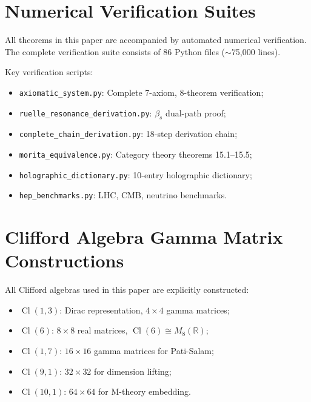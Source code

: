 \documentclass[12pt,a4paper]{article}
\newcommand{\R}{\mathbb{R}}
\newcommand{\Cl}{\operatorname{Cl}}
\begin{document}
\appendix
\section{Numerical Verification Suites}

All theorems in this paper are accompanied by automated numerical verification. 
The complete verification suite consists of 86 Python files ($\sim$75,000 lines).

Key verification scripts:
\begin{itemize}
  \item \texttt{axiomatic\_system.py}: Complete 7-axiom, 8-theorem verification;
  \item \texttt{ruelle\_resonance\_derivation.py}: $\beta_s$ dual-path proof;
  \item \texttt{complete\_chain\_derivation.py}: 18-step derivation chain;
  \item \texttt{morita\_equivalence.py}: Category theory theorems 15.1--15.5;
  \item \texttt{holographic\_dictionary.py}: 10-entry holographic dictionary;
  \item \texttt{hep\_benchmarks.py}: LHC, CMB, neutrino benchmarks.
\end{itemize}

\section{Clifford Algebra Gamma Matrix Constructions}

All Clifford algebras used in this paper are explicitly constructed:
\begin{itemize}
  \item $\Cl(1,3)$: Dirac representation, $4\times4$ gamma matrices;
  \item $\Cl(6)$: $8\times8$ real matrices, $\Cl(6) \cong M_8(\R)$;
  \item $\Cl(1,7)$: $16\times16$ gamma matrices for Pati-Salam;
  \item $\Cl(9,1)$: $32\times32$ for dimension lifting;
  \item $\Cl(10,1)$: $64\times64$ for M-theory embedding.
\end{itemize}
\end{document}
